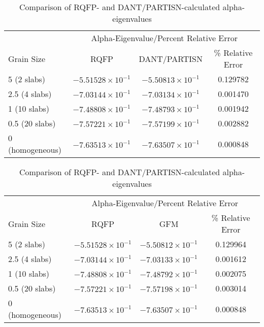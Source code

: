 \begin{table}[!htbp]
	\caption{Comparison of RQFP-calculated eigenvalues to various methods for multi-region scattering slab ($M = 500$, $L = 64$, Tolerance = $10^{-12}$)}
	\label{table:RQ_DE_DANT_GFM}
	\begin{subtable}[!htbp]{1.0\textwidth}
	\centering{}
	\begin{tabular}{@{}lccc@{}}\toprule
	& \multicolumn{3}{c}{Alpha-Eigenvalue/Percent Relative Error} \\
	\cmidrule{2-4} Grain Size & RQFP & DANT/PARTISN & \% Relative Error \\
	\midrule
	5 (2 slabs) & $-5.51528 \times 10^{-1}$ & $-5.50813 \times 10^{-1}$ & 0.129782 \\ 
	2.5 (4 slabs) & $-7.03144 \times 10^{-1}$ & $-7.03134 \times 10^{-1}$ & 0.001470 \\ 
	1 (10 slabs) & $-7.48808 \times 10^{-1}$ & $-7.48793 \times 10^{-1}$ & 0.001942 \\ 
	0.5 (20 slabs) & $-7.57221 \times 10^{-1}$ & $-7.57199 \times 10^{-1}$ & 0.002882 \\ 
	0 (homogeneous) & $-7.63513 \times 10^{-1}$ & $-7.63507 \times 10^{-1}$ & 0.000848 \\ 
	\bottomrule
	\end{tabular}
	\caption{Comparison of RQFP- and DANT/PARTISN-calculated alpha-eigenvalues}
	\label{AlphaDANT}
	\end{subtable}%
	\vspace{0.25cm}
	\begin{subtable}[!htbp]{1.0\textwidth}
	\centering{}
	\begin{tabular}{@{}lccc@{}}\toprule
	& \multicolumn{3}{c}{Alpha-Eigenvalue/Percent Relative Error} \\
	\cmidrule{2-4} Grain Size & RQFP & GFM & \% Relative Error \\
	\midrule
	5 (2 slabs) & $-5.51528 \times 10^{-1}$ & $-5.50812 \times 10^{-1}$ & 0.129964 \\ 
	2.5 (4 slabs) & $-7.03144 \times 10^{-1}$ & $-7.03133 \times 10^{-1}$ & 0.001612 \\ 
	1 (10 slabs) & $-7.48808 \times 10^{-1}$ & $-7.48792 \times 10^{-1}$ & 0.002075 \\ 
	0.5 (20 slabs) & $-7.57221 \times 10^{-1}$ & $-7.57198 \times 10^{-1}$ & 0.003014 \\ 
	0 (homogeneous) & $-7.63513 \times 10^{-1}$ & $-7.63507 \times 10^{-1}$ & 0.000848 \\ 

\end{tabular}
\end{subtable}
\end{table}
